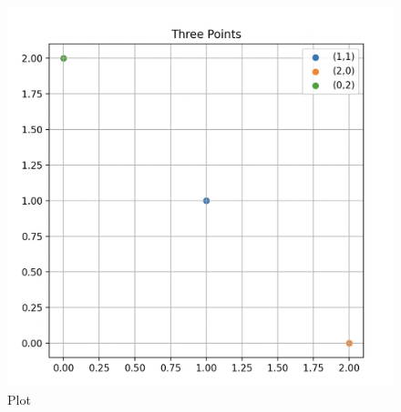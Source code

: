 \documentclass[12pt]{article}
\begin{document}
\begin{figure}[H]
    \centering
    \includegraphics[width=0.7\columnwidth]{Figs/527.png}
    \caption{Plot}
    \label{fig:placeholder}
\end{figure}
\end{document}
